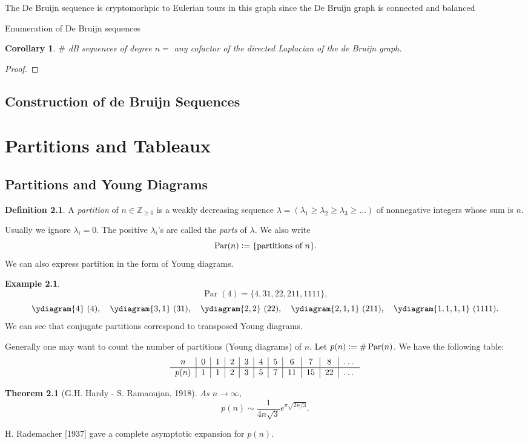 \documentclass{report}
\newcommand{\Z}{\mathbb{Z}}
\def \Par {\operatorname{Par}}
\newcommand{\defeq}{\vcentcolon=}
\newtheorem{theorem}{Theorem}[section]
\newtheorem{corollary}{Corollary}[section]
\theoremstyle{definition}
\newtheorem{definition}{Definition}[section]
\newtheorem{example}{Example}[section]
\theoremstyle{remark}
\numberwithin{equation}{section}
\newcommand*\ttlmath[2]{\texorpdfstring{$\boldsymbol{#1}$}{#2}}
\begin{document}
The De Bruijn sequence is cryptomorhpic to Eulerian tours in this graph since the De Bruijn graph is connected and balanced 

Enumeration of De Bruijn sequences
\begin{corollary}
    $\#$ dB sequences of degree $n = $ any cofactor of the directed Laplacian of the de Bruijn graph.
\end{corollary}

\begin{proof}

\end{proof}
\section{Construction of de Bruijn Sequences}

\chapter{Partitions and Tableaux}
\section{Partitions and Young Diagrams}
\begin{definition}
    A \emph{partition} of $n \in \Z_{\geq 0}$ is a weakly decreasing sequence $\lambda = (\lambda_1 \geq \lambda_2 \geq \lambda_3 \geq \ldots)$ of nonnegative integers whose sum is $n$.
\end{definition}
Usually we ignore $\lambda_i = 0$. The positive $\lambda_i$'s are called the \emph{parts} of $\lambda$.
We also write \[
    \Par(n) \defeq \{\text{partitions of } n\}.    
\]
We can also express partition in the form of Young diagrams.
\begin{example}
    \[\Par(4) = \{4, 31, 22, 211, 1111\},\]
    \[
        \ydiagram{4}\ (4),\quad \ydiagram{3, 1}\ (31),\quad \ydiagram{2, 2}\ (22),\quad \ydiagram{2, 1, 1}\ (211),\quad \ydiagram{1, 1, 1, 1}\ (1111).   
    \]
    We can see that conjugate partitions correspond to transposed Young diagrams.
\end{example}
Generally one may want to count the number of partitions (Young diagrams) of $n$. Let $p(n) \defeq \#\Par(n)$. We have the following table: 
\[
    \begin{tabular}{c|c|c|c|c|c|c|c|c|c|c}
        $n$ & 0 & 1 & 2 & 3 & 4 & 5 & 6 & 7 & 8 & \ldots \\
        \hline
        $p(n)$ & 1 & 1 & 2 & 3 & 5 & 7 & 11 & 15 & 22 & \ldots
    \end{tabular}    
\]
\begin{theorem}[G.H. Hardy - S. Ramanujan, 1918]
    As $n \to \infty$,
    \[p(n) \sim \frac{1}{4n\sqrt{3}}e^{\pi\sqrt{2n/3}}.\]
\end{theorem}
H. Rademacher [1937] gave a complete asymptotic expansion for $p(n)$.
\end{document}
